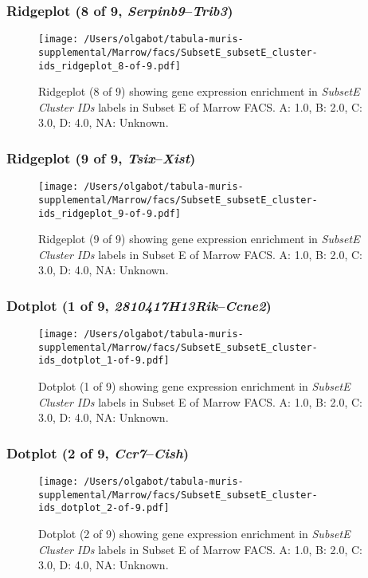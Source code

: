 \clearpage

\subsubsection{Ridgeplot (8 of 9, \emph{Serpinb9}--\emph{Trib3})}
\begin{figure}[h]
\centering
\texttt{[image: /Users/olgabot/tabula-muris-supplemental/Marrow/facs/SubsetE\_subsetE\_cluster-ids\_ridgeplot\_8-of-9.pdf]}

\caption{ Ridgeplot (8 of 9)  showing gene expression enrichment in \emph{SubsetE Cluster IDs} labels in Subset E of Marrow FACS. A: 1.0, B: 2.0, C: 3.0, D: 4.0, NA: Unknown.}
\end{figure}


\clearpage

\subsubsection{Ridgeplot (9 of 9, \emph{Tsix}--\emph{Xist})}
\begin{figure}[h]
\centering
\texttt{[image: /Users/olgabot/tabula-muris-supplemental/Marrow/facs/SubsetE\_subsetE\_cluster-ids\_ridgeplot\_9-of-9.pdf]}

\caption{ Ridgeplot (9 of 9)  showing gene expression enrichment in \emph{SubsetE Cluster IDs} labels in Subset E of Marrow FACS. A: 1.0, B: 2.0, C: 3.0, D: 4.0, NA: Unknown.}
\end{figure}


\clearpage

\subsubsection{Dotplot (1 of 9, \emph{2810417H13Rik}--\emph{Ccne2})}
\begin{figure}[h]
\centering
\texttt{[image: /Users/olgabot/tabula-muris-supplemental/Marrow/facs/SubsetE\_subsetE\_cluster-ids\_dotplot\_1-of-9.pdf]}

\caption{ Dotplot (1 of 9)  showing gene expression enrichment in \emph{SubsetE Cluster IDs} labels in Subset E of Marrow FACS. A: 1.0, B: 2.0, C: 3.0, D: 4.0, NA: Unknown.}
\end{figure}


\clearpage

\subsubsection{Dotplot (2 of 9, \emph{Ccr7}--\emph{Cish})}
\begin{figure}[h]
\centering
\texttt{[image: /Users/olgabot/tabula-muris-supplemental/Marrow/facs/SubsetE\_subsetE\_cluster-ids\_dotplot\_2-of-9.pdf]}

\caption{ Dotplot (2 of 9)  showing gene expression enrichment in \emph{SubsetE Cluster IDs} labels in Subset E of Marrow FACS. A: 1.0, B: 2.0, C: 3.0, D: 4.0, NA: Unknown.}
\end{figure}


